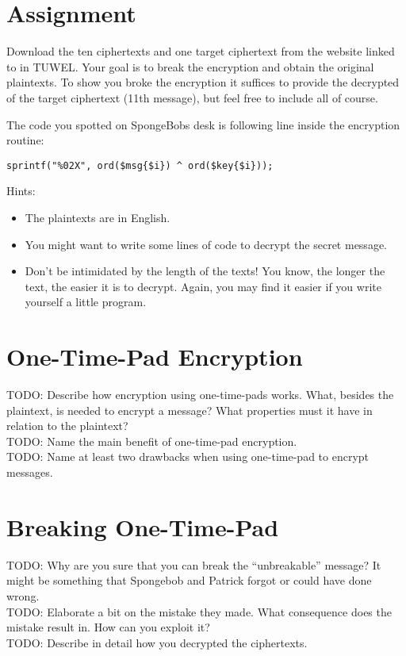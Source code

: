 \documentclass{scrartcl}
\newcommand\todo[1]{TODO: #1}
\begin{document}
\section*{Assignment}
Download the ten ciphertexts and one target ciphertext from the website
linked to in TUWEL. Your goal is to break the encryption and obtain the
original plaintexts. To show you broke the encryption it suffices to provide
the decrypted of the target ciphertext (11th message), but feel free to include all of
course.

The code you spotted on SpongeBobs desk is following line inside the encryption
routine:
\begin{lstlisting}
sprintf("%02X", ord($msg{$i}) ^ ord($key{$i}));
\end{lstlisting}

Hints:
\begin{itemize}
    \item The plaintexts are in English.
    \item You might want to write some lines of code to decrypt the secret message.
    \item Don't be intimidated by the length of the texts! You know, the longer the text, the easier it is to decrypt. Again, you may find it easier if you write yourself a little program.
\end{itemize}

\section*{One-Time-Pad Encryption}
\todo{Describe how encryption using one-time-pads works. What, besides the
plaintext, is needed to encrypt a message? What properties must it have in
relation to the plaintext?}\\
\todo{Name the main benefit of one-time-pad encryption.}\\
\todo{Name at least two drawbacks when using one-time-pad to encrypt messages.}

\section*{Breaking One-Time-Pad}
\todo{Why are you sure that you can break the ``unbreakable'' message? It might
be something that Spongebob and Patrick forgot or could have done wrong.}\\
\todo{Elaborate a bit on the mistake they made. What consequence does the
mistake result in. How can you exploit it?}\\
\todo{Describe in detail how you decrypted the ciphertexts.}
\end{document}
